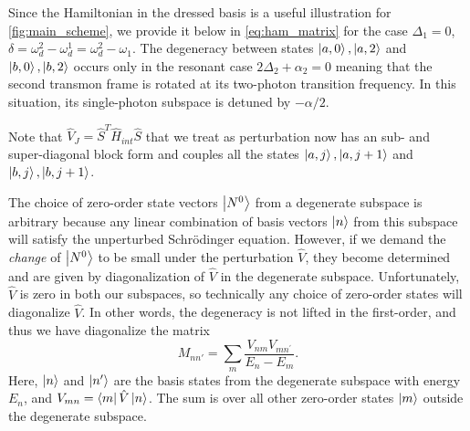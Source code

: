 \documentclass[%
 pra,
 amsmath,amssymb,
 reprint,%
]{revtex4-1}
\begin{document}
Since the Hamiltonian in the dressed basis is a 
useful illustration for 
\autoref{fig:main_scheme}, we provide it below in 
\autoref{eq:ham_matrix} for the case $\Delta_1 = 
0$, $\delta = \omega_d^2 - 	\omega_d^1 = 
\omega_d^2 - \omega_1$. The degeneracy between 
states $\ket{a, 0}, \ket{a,2}$ and $\ket{b, 0}, 
\ket{b,2}$ occurs only in the resonant case 
$2\Delta_2   + \alpha_2 = 0$ meaning that the 
second transmon frame is rotated at its 
two-photon transition frequency. In this 
situation, its single-photon subspace is detuned 
by $-\alpha/2$.



Note that $\hat V_J = \hat S^T \hat H_{int} \hat 
S$ that we treat as perturbation now has an sub- 
and super-diagonal block form and couples all the 
states $\ket{a, j}, \ket{a,j+1}$ and $\ket{b, j}, 
\ket{b,j+1}$.


The choice of zero-order state vectors $\ket{N^0}$ from a degenerate subspace is arbitrary because any linear combination of basis vectors $\ket{n}$ from this subspace will satisfy the unperturbed Schrödinger equation. However, if we demand the \textit{change} of $\ket{N^0}$ to be small under the perturbation $\hat V$, they become determined and are given by diagonalization of $\hat V$ in the degenerate subspace. Unfortunately, $\hat V$ is zero in both our subspaces, so technically any choice of zero-order states will diagonalize $\hat V$. In other words, the degeneracy is not lifted in the first-order, and thus we have diagonalize the matrix\cite{landau2013quantum}
\begin{equation}
	M_{nn'} = \sum\limits_{m}\frac{V_{ nm}V_{mn^\prime}}{E_n-E_m}.
\end{equation}
Here, $\ket{n}$ and $\ket{n'}$ are the basis 
states from the degenerate subspace with energy 
$E_n$, and $V_{mn} = \bra{m} \hat  V \ket{n}$. 
The sum is over all other zero-order states 
$\ket{m}$ outside the degenerate subspace.
\end{document}
